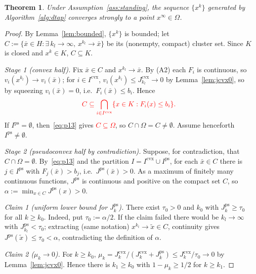 \documentclass[]{interact}
\theoremstyle{plain}
\newtheorem{theorem}{Theorem}[section]
\theoremstyle{definition}
\theoremstyle{remark}
\newcommand{\cvx}{\mathrm{cvx}}
\newcommand{\ps}{\mathrm{ps}}
\begin{document}
\begin{theorem}\label{thm:strong}
Under Assumption~\ref{ass:standing}, the sequence $\{x^k\}$ generated by
Algorithm~\ref{alg:dtap} converges strongly to a point $x^\infty\in\Omega$.
\end{theorem}
\begin{proof}
By Lemma~\ref{lem:bounded}, $\{x^k\}$ is bounded; let
$C:=\{\bar x\in H:\exists\,k_l\to\infty,\ x^{k_l}\to\bar x\}$ be its (nonempty, compact)
cluster set. Since $K$ is closed and $x^k\in K$, $C\subseteq K$.

\emph{Stage 1 (convex half).} Fix $\bar x\in C$ and $x^{k_l}\to\bar x$. By (A2) each
$F_i$ is continuous, so $v_i(x^{k_l})\to v_i(\bar x)$; for $i\in I^{\cvx}$,
$v_i(x^{k_l})\le J^{\cvx}_{k_l}\to0$ by Lemma~\ref{lem:jcvx0}, so by squeezing
$v_i(\bar x)=0$, i.e.\ $F_i(\bar x)\le b_i$. Hence
\begin{equation}\label{eq:p13}\textcolor{red}{
C\subseteq\bigcap_{i\in I^{\cvx}}\{x\in K:F_i(x)\le b_i\}.
}\end{equation}
If $I^{\ps}=\emptyset$, then~\eqref{eq:p13} gives \leavevmode\textcolor{red}{$C\subseteq\Omega$},
so $C\cap\Omega=C\ne\emptyset$.
Assume henceforth $I^{\ps}\ne\emptyset$.

\emph{Stage 2 (pseudoconvex half by contradiction).} Suppose, for contradiction, that
$C\cap\Omega=\emptyset$. By~\eqref{eq:p13} and the partition $I=I^{\cvx}\cup I^{\ps}$, for
each $\bar x\in C$ there is $j\in I^{\ps}$ with $F_j(\bar x)>b_j$, i.e.\
$J^{\ps}(\bar x)>0$. As a maximum of finitely many continuous functions, $J^{\ps}$ is
continuous and positive on the compact set $C$, so $\alpha:=\min_{x\in C}J^{\ps}(x)>0$.

\smallskip
\emph{Claim 1 (uniform lower bound for $J^{\ps}_k$).} There exist $\tau_0>0$ and $k_0$
with $J^{\ps}_k\ge\tau_0$ for all $k\ge k_0$. Indeed, put $\tau_0:=\alpha/2$. If the claim
failed there would be $k_l\to\infty$ with $J^{\ps}_{k_l}<\tau_0$; extracting (same
notation) $x^{k_l}\to\tilde x\in C$, continuity gives $J^{\ps}(\tilde x)\le\tau_0<\alpha$,
contradicting the definition of $\alpha$.

\smallskip
\emph{Claim 2 ($\mu_k\to0$).} For $k\ge k_0$,
$\mu_k=J^{\cvx}_k/(J^{\cvx}_k+J^{\ps}_k)\le J^{\cvx}_k/\tau_0\to0$ by
Lemma~\ref{lem:jcvx0}. Hence there is $k_1\ge k_0$ with $1-\mu_k\ge1/2$ for $k\ge k_1$.


\end{proof}
\end{document}
